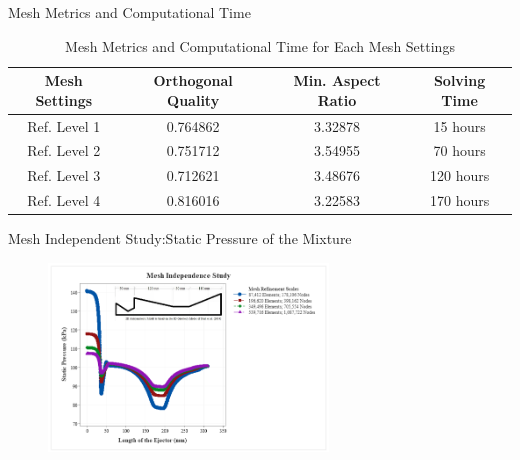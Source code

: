 \begin{frame}{Mesh Metrics and Computational Time}
    \begin{table}[h]
      \centering
       \caption{Mesh Metrics and Computational Time for Each Mesh Settings}
      \label{tab:meshelementsandnodes}
      \begin{tabular}{cccc}
      \hline
         Mesh Settings  & Orthogonal Quality  & Min. Aspect Ratio & Solving Time\\
      \hline
         Ref. Level 1  & 0.764862 & 3.32878 & 15 hours\\
         Ref. Level 2 & 0.751712 & 3.54955 & 70 hours\\
         Ref. Level 3 & 0.712621 & 3.48676 & 120 hours\\
         Ref. Level 4 & 0.816016 & 3.22583 & 170 hours\\
      \hline
      \end{tabular}
  \end{table}
\end{frame}

\begin{frame}{Mesh Independent Study:Static Pressure of the Mixture}
    \begin{figure}[h]
      \centering
      \includegraphics[height=5cm]{images/MISstaticpressure.png}
      \label{fig:meshindependentstudy}
   \end{figure}
\end{frame}

